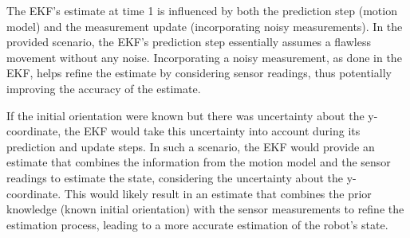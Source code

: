 \documentclass[answers]{exam}
\begin{document}
\begin{questions}
\begin{parts}
\begin{solution}
            The EKF's estimate at time 1 is influenced by both the prediction step (motion
            model) and the measurement update (incorporating noisy measurements). In the
            provided scenario, the EKF's prediction step essentially assumes a flawless
            movement without any noise. Incorporating a noisy measurement, as done in the
            EKF, helps refine the estimate by considering sensor readings, thus potentially
            improving the accuracy of the estimate.

            If the initial orientation were known but there was uncertainty about the
            y-coordinate, the EKF would take this uncertainty into account during its
            prediction and update steps. In such a scenario, the EKF would provide an
            estimate that combines the information from the motion model and the sensor
            readings to estimate the state, considering the uncertainty about the
            y-coordinate. This would likely result in an estimate that combines the prior
            knowledge (known initial orientation) with the sensor measurements to refine
            the estimation process, leading to a more accurate estimation of the robot's
            state.
        \end{solution}
    \end{parts}


\end{questions}
\end{document}
